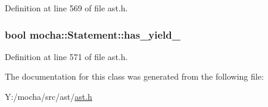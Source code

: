Definition at line 569 of file ast.h.

\hypertarget{classmocha_1_1_statement_ae9970a2c71dde36750e08ff3be61239f}{
\subsubsection[{has\_\-yield\_\-}]{\setlength{\rightskip}{0pt plus 5cm}bool {\bf mocha::Statement::has\_\-yield\_\-}}}
\label{classmocha_1_1_statement_ae9970a2c71dde36750e08ff3be61239f}


Definition at line 571 of file ast.h.



The documentation for this class was generated from the following file:\begin{DoxyCompactItemize}
\item 
Y:/mocha/src/ast/\hyperlink{ast_8h}{ast.h}\end{DoxyCompactItemize}
